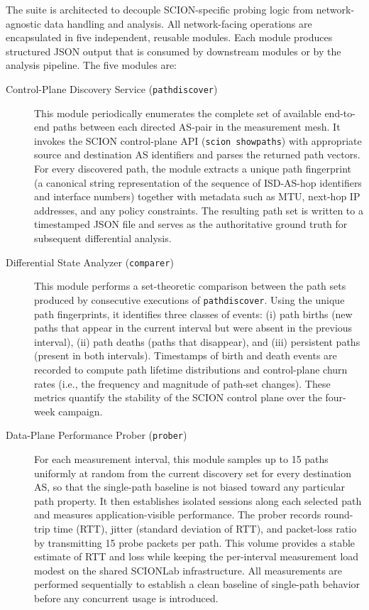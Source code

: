 \documentclass[pdflatex,sn-vancouver-num]{sn-jnl}%
\theoremstyle{thmstyleone}%
\theoremstyle{thmstyletwo}%
\theoremstyle{thmstylethree}%
\begin{document}
    The suite is architected to decouple SCION-specific probing logic from network-agnostic data handling and analysis. All network-facing operations are encapsulated in five independent, reusable modules. Each module produces structured JSON output that is consumed by downstream modules or by the analysis pipeline. The five modules are:

    \begin{description}
        \item[Control-Plane Discovery Service (\texttt{pathdiscover})] This module periodically enumerates the complete set of available end-to-end paths between each directed AS-pair in the measurement mesh. It invokes the SCION control-plane API (\texttt{scion showpaths}) with appropriate source and destination AS identifiers and parses the returned path vectors. For every discovered path, the module extracts a unique path fingerprint (a canonical string representation of the sequence of ISD-AS-hop identifiers and interface numbers) together with metadata such as MTU, next-hop IP addresses, and any policy constraints. The resulting path set is written to a timestamped JSON file and serves as the authoritative ground truth for subsequent differential analysis.\\

        \item[Differential State Analyzer (\texttt{comparer})] This module performs a set-theoretic comparison between the path sets produced by consecutive executions of \texttt{pathdiscover}. Using the unique path fingerprints, it identifies three classes of events: (i) path births (new paths that appear in the current interval but were absent in the previous interval), (ii) path deaths (paths that disappear), and (iii) persistent paths (present in both intervals). Timestamps of birth and death events are recorded to compute path lifetime distributions and control-plane churn rates (i.e., the frequency and magnitude of path-set changes). These metrics quantify the stability of the SCION control plane over the four-week campaign.\\

        \item[Data-Plane Performance Prober (\texttt{prober})] For each measurement interval, this module samples up to 15 paths uniformly at random from the current discovery set for every destination AS, so that the single-path baseline is not biased toward any particular path property. It then establishes isolated sessions along each selected path and measures application-visible performance. The prober records round-trip time (RTT), jitter (standard deviation of RTT), and packet-loss ratio by transmitting 15 probe packets per path. This volume provides a stable estimate of RTT and loss while keeping the per-interval measurement load modest on the shared SCIONLab infrastructure. All measurements are performed sequentially to establish a clean baseline of single-path behavior before any concurrent usage is introduced.\\
        

\end{description}
\end{document}
